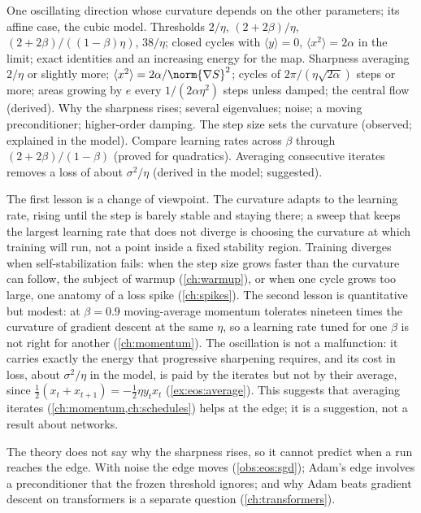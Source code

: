 \begin{refsection}
{One oscillating direction whose curvature depends on the other parameters; its affine case, the cubic model.}
{Thresholds $2/\eta$, $(2+2\beta)/\eta$, $(2+2\beta)/((1-\beta)\eta)$, $38/\eta$; closed cycles with $\langle y\rangle=0$, $\langle x^2\rangle=2\alpha$ in the limit; exact identities and an increasing energy for the map.}
{Sharpness averaging $2/\eta$ or slightly more; $\langle x^2\rangle=2\alpha/\norm{\nabla S}^2$; cycles of $2\pi/(\eta\sqrt{2\alpha})$ steps or more; areas growing by $e$ every $1/(2\alpha\eta^2)$ steps unless damped; the central flow (derived).}
{Why the sharpness rises; several eigenvalues; noise; a moving preconditioner; higher-order damping.}
{The step size sets the curvature (observed; explained in the model). Compare learning rates across $\beta$ through $(2+2\beta)/(1-\beta)$ (proved for quadratics). Averaging consecutive iterates removes a loss of about $\sigma^2/\eta$ (derived in the model; suggested).}

The first lesson is a change of viewpoint. The curvature adapts to the learning rate, rising until the step is barely stable and staying there; a sweep that keeps the largest learning rate that does not diverge is choosing the curvature at which training will run, not a point inside a fixed stability region. Training diverges when self-stabilization fails: when the step size grows faster than the curvature can follow, the subject of warmup (\cref{ch:warmup}), or when one cycle grows too large, one anatomy of a loss spike (\cref{ch:spikes}). The second lesson is quantitative but modest: at $\beta=0.9$ moving-average momentum tolerates nineteen times the curvature of gradient descent at the same $\eta$, so a learning rate tuned for one $\beta$ is not right for another (\cref{ch:momentum}). The oscillation is not a malfunction: it carries exactly the energy that progressive sharpening requires, and its cost in loss, about $\sigma^2/\eta$ in the model, is paid by the iterates but not by their average, since $\frac12(x_t+x_{t+1})=-\frac12\eta y_tx_t$ (\cref{ex:eos:average}). This suggests that averaging iterates (\cref{ch:momentum,ch:schedules}) helps at the edge; it is a suggestion, not a result about networks.

The theory does not say why the sharpness rises, so it cannot predict when a run reaches the edge. With noise the edge moves (\cref{obs:eos:sgd}); Adam's edge involves a preconditioner that the frozen threshold ignores; and why Adam beats gradient descent on transformers is a separate question (\cref{ch:transformers}).


\end{refsection}
